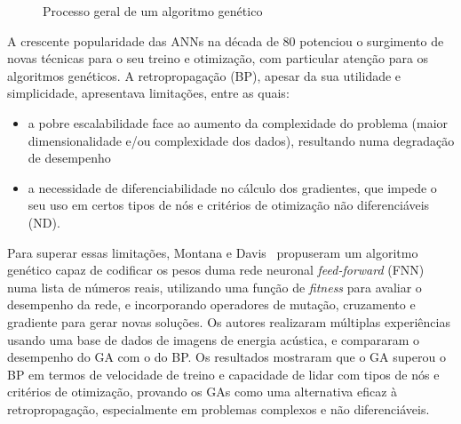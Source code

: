 \begin{figure}[htbp]
    \centering
    \caption{Processo geral de um algoritmo genético}
    \label{fig:ea_flowchart}
\end{figure}

A crescente popularidade das ANNs na década de 80 potenciou o surgimento de novas técnicas para o seu treino e otimização, com particular atenção para os algoritmos genéticos.
A retropropagação (BP), apesar da sua utilidade e simplicidade, apresentava limitações, entre as quais:
\begin{itemize}
    \item a pobre escalabilidade face ao aumento da complexidade do problema (maior dimensionalidade e/ou complexidade dos dados), resultando numa degradação de desempenho
    \item a necessidade de diferenciabilidade no cálculo dos gradientes, que impede o seu uso em certos tipos de nós e critérios de otimização não diferenciáveis (ND).
\end{itemize}

Para superar essas limitações, Montana e Davis~\cite{Montana1989} propuseram um algoritmo genético capaz de codificar os pesos duma rede neuronal \textit{feed-forward} (FNN) numa lista de números reais, utilizando uma função de \textit{fitness} para avaliar o desempenho da rede, e incorporando operadores de mutação, cruzamento e gradiente para gerar novas soluções.
Os autores realizaram múltiplas experiências usando uma base de dados de imagens de energia acústica, e compararam o desempenho do GA com o do BP. Os resultados mostraram que o GA superou o BP em termos de velocidade de treino e capacidade de lidar com tipos de nós e critérios de otimização, provando os GAs como uma alternativa eficaz à retropropagação, especialmente em problemas complexos e não diferenciáveis.

